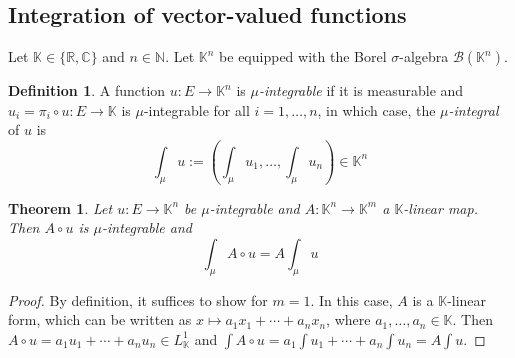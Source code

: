 \documentclass[11pt, a4paper, openany]{book}
\newtheorem{thm}{Theorem}\newtheorem{lem}{Lemma}\newtheorem{crl}{Corollary}
\theoremstyle{definition}
\newtheorem{define}{Definition}\newtheorem{exam}{Example}\newtheorem{remark}{Remark}
\newcommand{\cat}[1]{\textup{\textsf{#1}}}
\begin{document}
\subsection{Integration of vector-valued functions}
    Let $\mathbb{K}\in\{\mathbb{R},\mathbb{C}\}$ and $n\in\mathbb{N}$. Let $\mathbb{K}^n$ be equipped with the Borel $\sigma$-algebra $\mathscr{B}(\mathbb{K}^n)$.
    \begin{define}
        A function $u:E\rightarrow\mathbb{K}^n$ is \textit{$\mu$-integrable} if it is measurable and $u_i=\pi_i\circ u:E\rightarrow\mathbb{K}$ is $\mu$-integrable for all $i=1,\dots,n$, in which case, the \textit{$\mu$-integral} of $u$ is
        \[
            \int_\mu u:=\left(\int_\mu u_1,\dots,\int_\mu u_n\right)\in\mathbb{K}^n
        \]
    \end{define}
    \begin{thm}\label{commutation of integral and linear map}
        Let $u:E\rightarrow\mathbb{K}^n$ be $\mu$-integrable and $A:\mathbb{K}^n\rightarrow\mathbb{K}^m$ a $\mathbb{K}$-linear map. Then $A\circ u$ is $\mu$-integrable and
        \[
            \int_\mu A\circ u=A\int_\mu u
        \]
    \end{thm}
    \begin{proof}
        By definition, it suffices to show for $m=1$. In this case, $A$ is a $\mathbb{K}$-linear form, which can be written as $x\mapsto a_1x_1+\cdots+a_nx_n$, where $a_1,\dots,a_n\in\mathbb{K}$. Then $A\circ u=a_1 u_1+\cdots+a_nu_n\in L_\mathbb{K}^1$ and $\int A\circ u=a_1\int u_1+\cdots+a_n\int u_n=A\int u$.
    \end{proof}
\end{document}
